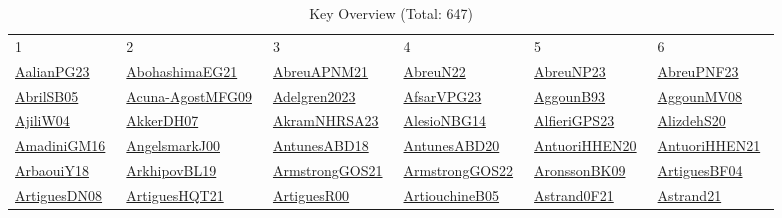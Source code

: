 \begin{longtable}{*{6}{l}}
\rowcolor{white}\caption{Key Overview (Total: 647)}\\ \toprule
\rowcolor{white}1 & 2 & 3 & 4 & 5 & 6\\ \midrule
\endhead
\bottomrule
\endfoot
\href{works/AalianPG23.pdf}{AalianPG23}~\cite{AalianPG23} & \href{works/AbohashimaEG21.pdf}{AbohashimaEG21}~\cite{AbohashimaEG21} & \href{works/AbreuAPNM21.pdf}{AbreuAPNM21}~\cite{AbreuAPNM21} & \href{works/AbreuN22.pdf}{AbreuN22}~\cite{AbreuN22} & \href{works/AbreuNP23.pdf}{AbreuNP23}~\cite{AbreuNP23} & \href{}{AbreuPNF23}~\cite{AbreuPNF23}\\ 
\href{works/AbrilSB05.pdf}{AbrilSB05}~\cite{AbrilSB05} & \href{works/Acuna-AgostMFG09.pdf}{Acuna-AgostMFG09}~\cite{Acuna-AgostMFG09} & \href{}{Adelgren2023}~\cite{Adelgren2023} & \href{}{AfsarVPG23}~\cite{AfsarVPG23} & \href{works/AggounB93.pdf}{AggounB93}~\cite{AggounB93} & \href{}{AggounMV08}~\cite{AggounMV08}\\ 
\href{}{AjiliW04}~\cite{AjiliW04} & \href{works/AkkerDH07.pdf}{AkkerDH07}~\cite{AkkerDH07} & \href{works/AkramNHRSA23.pdf}{AkramNHRSA23}~\cite{AkramNHRSA23} & \href{works/AlesioNBG14.pdf}{AlesioNBG14}~\cite{AlesioNBG14} & \href{works/AlfieriGPS23.pdf}{AlfieriGPS23}~\cite{AlfieriGPS23} & \href{}{AlizdehS20}~\cite{AlizdehS20}\\ 
\href{works/AmadiniGM16.pdf}{AmadiniGM16}~\cite{AmadiniGM16} & \href{works/AngelsmarkJ00.pdf}{AngelsmarkJ00}~\cite{AngelsmarkJ00} & \href{works/AntunesABD18.pdf}{AntunesABD18}~\cite{AntunesABD18} & \href{works/AntunesABD20.pdf}{AntunesABD20}~\cite{AntunesABD20} & \href{works/AntuoriHHEN20.pdf}{AntuoriHHEN20}~\cite{AntuoriHHEN20} & \href{works/AntuoriHHEN21.pdf}{AntuoriHHEN21}~\cite{AntuoriHHEN21}\\ 
\href{works/ArbaouiY18.pdf}{ArbaouiY18}~\cite{ArbaouiY18} & \href{}{ArkhipovBL19}~\cite{ArkhipovBL19} & \href{works/ArmstrongGOS21.pdf}{ArmstrongGOS21}~\cite{ArmstrongGOS21} & \href{works/ArmstrongGOS22.pdf}{ArmstrongGOS22}~\cite{ArmstrongGOS22} & \href{works/AronssonBK09.pdf}{AronssonBK09}~\cite{AronssonBK09} & \href{works/ArtiguesBF04.pdf}{ArtiguesBF04}~\cite{ArtiguesBF04}\\ 
\href{}{ArtiguesDN08}~\cite{ArtiguesDN08} & \href{}{ArtiguesHQT21}~\cite{ArtiguesHQT21} & \href{works/ArtiguesR00.pdf}{ArtiguesR00}~\cite{ArtiguesR00} & \href{works/ArtiouchineB05.pdf}{ArtiouchineB05}~\cite{ArtiouchineB05} & \href{works/Astrand0F21.pdf}{Astrand0F21}~\cite{Astrand0F21} & \href{works/Astrand21.pdf}{Astrand21}~\cite{Astrand21}\\ 

\end{longtable}
